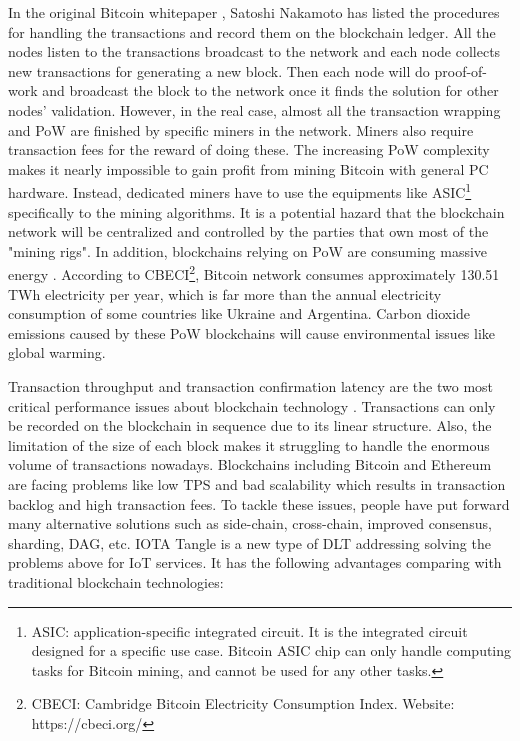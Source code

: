 In the original Bitcoin whitepaper \cite{nakamoto2008peer}, Satoshi Nakamoto has listed the procedures for handling the transactions and record them on the blockchain ledger.
All the nodes listen to the transactions broadcast to the network and each node collects new transactions for generating a new block.
Then each node will do proof-of-work and broadcast the block to the network once it finds the solution for other nodes' validation.
However, in the real case, almost all the transaction wrapping and PoW are finished by specific miners in the network. Miners also require transaction fees for the reward of doing these.
The increasing PoW complexity makes it nearly impossible to gain profit from mining Bitcoin with general PC hardware. Instead, dedicated miners have to use the equipments like ASIC\footnote{ASIC: application-specific integrated circuit. It is the integrated circuit designed for a specific use case. Bitcoin ASIC chip can only handle computing tasks for Bitcoin mining, and cannot be used for any other tasks.} specifically to the mining algorithms.
It is a potential hazard that the blockchain network will be centralized and controlled by the parties that own most of the "mining rigs". In addition, blockchains relying on PoW are consuming massive energy \cite{sedlmeir2020energy}. According to CBECI\footnote{CBECI: Cambridge Bitcoin Electricity Consumption Index. Website: https://cbeci.org/}, Bitcoin network consumes approximately 130.51 TWh electricity per year, which is far more than the annual electricity consumption of some countries like Ukraine and Argentina. Carbon dioxide emissions caused by these PoW blockchains will cause environmental issues like global warming.


Transaction throughput and transaction confirmation latency are the two most critical performance issues about blockchain technology \cite{zhou2020solutions}.
Transactions can only be recorded on the blockchain in sequence due to its linear structure. Also, the limitation of the size of each block makes it struggling to handle the enormous volume of transactions nowadays.
Blockchains including Bitcoin and Ethereum are facing problems like low TPS and bad scalability which results in transaction backlog and high transaction fees.
To tackle these issues, people have put forward many alternative solutions such as side-chain, cross-chain, improved consensus, sharding, DAG, etc.
IOTA Tangle is a new type of DLT addressing solving the problems above for IoT services. It has the following advantages comparing with traditional blockchain technologies:

